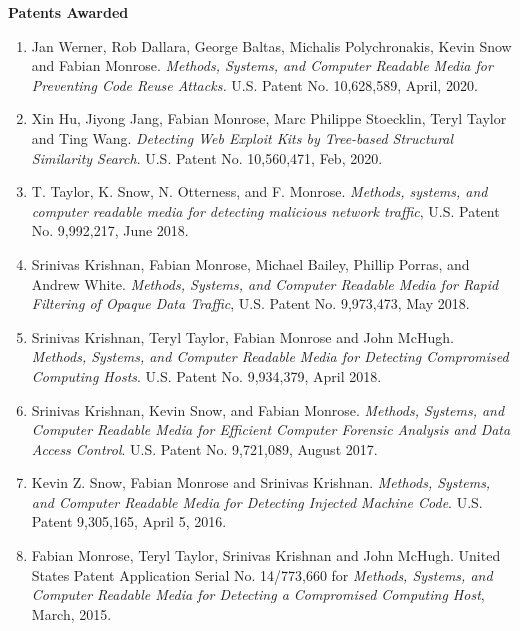 \documentclass[11pt]{article}
\newcommand{\ignore}[1]{}
\newenvironment{cvhanglist}{%
  \begin{list}{}{%
    \setlength{\leftmargin}{1.8em}%
    \setlength{\itemindent}{-1.8em}%
    \setlength{\labelwidth}{0pt}%
    \setlength{\labelsep}{0pt}%
    \setlength{\itemsep}{0.35em}%
    \setlength{\parsep}{0pt}%
    \setlength{\topsep}{0.25em}%
  }%
}{\end{list}}
\begin{document}
\begin{cvhanglist}
\item {\bf Patents Awarded}
\begin{enumerate}[resume]

\item Jan Werner, Rob Dallara, George Baltas, Michalis Polychronakis, Kevin Snow and {Fabian Monrose}. \emph{Methods, Systems, and Computer Readable Media for Preventing Code Reuse Attacks.} U.S. Patent No. 10,628,589, April, 2020.

\item Xin Hu, Jiyong Jang, {Fabian Monrose}, Marc Philippe Stoecklin, Teryl Taylor and Ting Wang. \emph{Detecting Web Exploit Kits by Tree-based Structural Similarity Search}.
U.S. Patent No. 10,560,471, Feb, 2020.

\item T. Taylor, K. Snow, N. Otterness, and F. Monrose. \emph{Methods, systems, and computer readable media for detecting malicious network traffic}, U.S. Patent No. 9,992,217, June 2018.

\item Srinivas Krishnan, {Fabian Monrose}, Michael Bailey, Phillip Porras, and Andrew White. \emph{Methods, Systems, and Computer Readable Media for Rapid Filtering of Opaque Data Traffic}, U.S. Patent No. 9,973,473, May 2018.

\item Srinivas Krishnan, Teryl Taylor, {Fabian Monrose} and John McHugh. \emph{
Methods, Systems, and Computer Readable Media for Detecting Compromised Computing Hosts}. U.S. Patent No. 9,934,379, April 2018.

\item Srinivas Krishnan, Kevin Snow, and {Fabian Monrose}. \emph{
Methods, Systems, and Computer Readable Media for Efficient Computer Forensic Analysis and Data Access Control}. U.S. Patent No. 9,721,089, August 2017.

\item Kevin Z. Snow, {Fabian Monrose} and Srinivas Krishnan. \emph{
Methods, Systems, and Computer Readable Media for Detecting Injected Machine Code}. U.S. Patent 9,305,165, April 5, 2016.

\item {Fabian Monrose}, Teryl Taylor, Srinivas Krishnan and John McHugh.
United States Patent Application Serial No. 14/773,660 for \emph{Methods, Systems, and Computer Readable Media for Detecting a Compromised Computing Host}, March, 2015.

\ignore{
\item K.Snow, S. Krishnan, and F. Monrose. \emph{
Efficient Digital Forensics Support using a Virtualized Environment}. Provisional Patent Application No.421/282 filed May, 2011.

}
\end{enumerate}
\end{cvhanglist}
\end{document}
